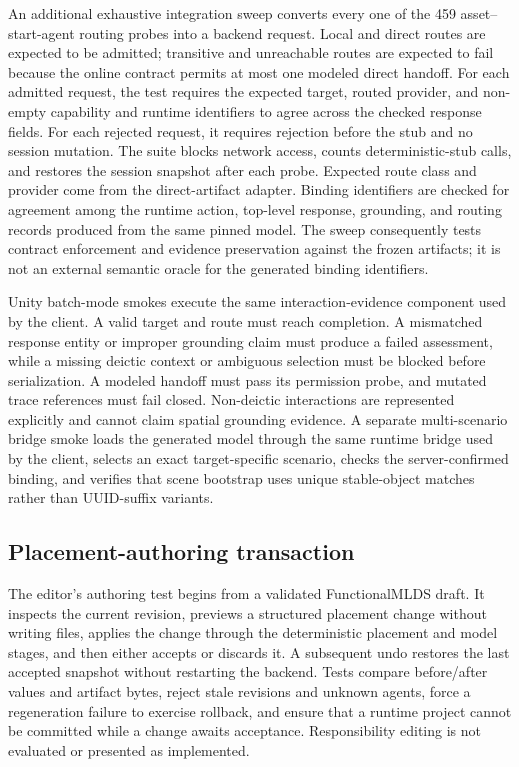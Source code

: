 An additional exhaustive integration sweep converts every one of the 459
asset--start-agent routing probes into a backend request. Local and direct
routes are expected to be admitted; transitive and unreachable routes are
expected to fail because the online contract permits at most one modeled direct
handoff. For each admitted request, the test requires the expected target,
routed provider, and non-empty capability and runtime identifiers to agree
across the checked response fields. For each rejected
request, it requires rejection before the stub and no session mutation. The
suite blocks network access, counts deterministic-stub calls, and restores the
session snapshot after each probe.
Expected route class and provider come from the direct-artifact adapter.
Binding identifiers are checked for agreement among the runtime action,
top-level response, grounding, and routing records produced from the same
pinned model. The sweep consequently tests contract enforcement and evidence
preservation against the frozen artifacts; it is not an external semantic
oracle for the generated binding identifiers.

Unity batch-mode smokes execute the same interaction-evidence component used by
the client. A valid target and route must reach completion. A mismatched
response entity or improper grounding claim must produce a failed assessment,
while a missing deictic context or ambiguous selection must be blocked before
serialization. A modeled handoff must pass its permission probe, and mutated
trace references must fail closed. Non-deictic interactions are represented
explicitly and cannot claim spatial grounding evidence. A separate
multi-scenario bridge smoke loads the generated model through the same runtime
bridge used by the client, selects an exact target-specific scenario, checks the server-confirmed
binding, and verifies that scene bootstrap uses unique stable-object matches
rather than UUID-suffix variants.

\subsection{Placement-authoring transaction}

The editor's authoring test begins from a validated FunctionalMLDS draft. It
inspects the current revision, previews a structured placement change without
writing files, applies the change through the deterministic placement and model
stages, and then either accepts or discards it. A subsequent undo restores the
last accepted snapshot without restarting the backend. Tests compare
before/after values and artifact bytes, reject stale revisions and unknown
agents, force a regeneration failure to exercise rollback, and ensure that a
runtime project cannot be committed while a change awaits acceptance.
Responsibility editing is not evaluated or presented as implemented.

